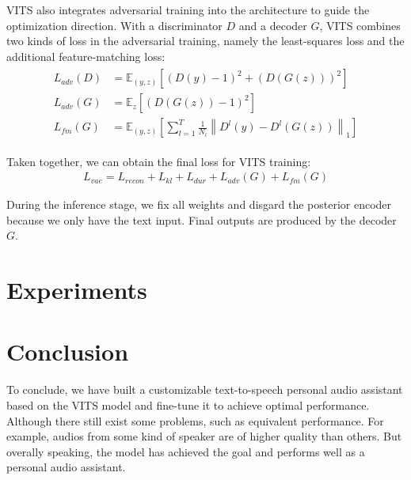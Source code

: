 \documentclass{article}
\begin{document}
VITS also integrates adversarial training into the architecture to guide the optimization direction. With a discriminator $D$ and a decoder $G$, VITS combines two kinds of loss in the adversarial training, namely the least-squares loss and the additional feature-matching loss:
\begin{align}
    \begin{split}
        L_{a d v}(D) & =\mathbb{E}_{(y, z)}\left[(D(y)-1)^{2}+(D(G(z)))^{2}\right] \\
        L_{a d v}(G) & =\mathbb{E}_{z}\left[(D(G(z))-1)^{2}\right] \\
        L_{f m}(G) & =\mathbb{E}_{(y, z)}\left[\sum_{l=1}^{T} \frac{1}{N_{l}}\left\|D^{l}(y)-D^{l}(G(z))\right\|_{1}\right]
    \end{split}
\end{align}

Taken together, we can obtain the final loss for VITS training:
\begin{align}
    L_{v a e}=L_{r e c o n}+L_{k l}+L_{d u r}+L_{a d v}(G)+L_{f m}(G)
\end{align}

During the inference stage, we fix all weights and disgard the posterior encoder because we only have the text input. Final outputs are produced by the decoder $G$.

\section{Experiments}
\label{sec:exper}

\section{Conclusion}
To conclude, we have built a customizable text-to-speech personal audio assistant based on the VITS model and fine-tune it to achieve optimal performance. Although there still exist some problems, such as equivalent performance. For example, audios from some kind of speaker are of higher quality than others. But overally speaking, the model has achieved the goal and performs well as a personal audio assistant.
\label{sec:con}



  
 
\end{document}
